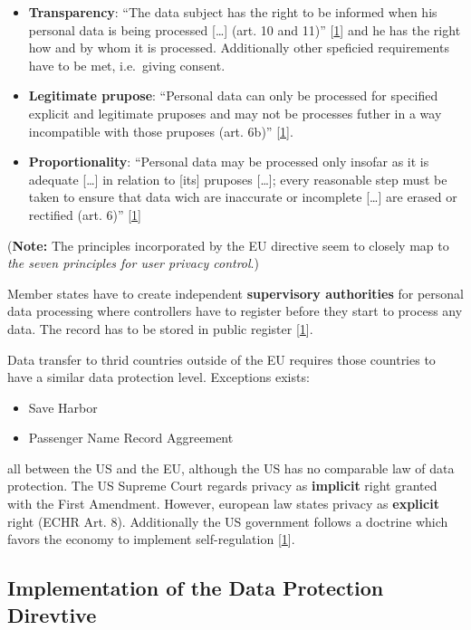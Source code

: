 \begin{itemize}
\item
\textbf{Transparency}: ``The data subject has the right to be informed when his personal data is being processed {[}\ldots{}{]} (art. 10 and 11)'' {[}\hyperref[references]{1}{]} and he has the right how and by whom it is processed.
Additionally other speficied requirements have to be met, i.e.~giving consent.
\item
\textbf{Legitimate prupose}: ``Personal data can only be processed for specified explicit and legitimate pruposes and may not be processes futher in a way incompatible with those pruposes (art. 6b)''
{[}\hyperref[references]{1}{]}.
\item
\textbf{Proportionality}: ``Personal data may be processed only insofar as it is adequate {[}\ldots{}{]} in relation to {[}its{]} pruposes {[}\ldots{}{]}; every reasonable step must be taken to ensure that data wich are inaccurate or incomplete {[}\ldots{}{]} are erased or rectified (art. 6)'' {[}\hyperref[references]{1}{]}
\end{itemize}

(\textbf{Note:} The principles incorporated by the EU directive seem to closely map to \emph{the seven principles for user privacy control}.)

Member states have to create independent \textbf{supervisory authorities} for personal data processing where controllers have to register before they start to process any data.
The record has to be stored in public register {[}\hyperref[references]{1}{]}.

Data transfer to thrid countries outside of the EU requires those countries to have a similar data protection level. Exceptions exists:

\begin{itemize}
\item
  Save Harbor
\item
  Passenger Name Record Aggreement
\end{itemize}

all between the US and the EU, although the US has no comparable law of data protection. 
The US Supreme Court regards privacy as \textbf{implicit} right granted with the First Amendment. However, european law states privacy as \textbf{explicit} right (ECHR Art. 8).
Additionally the US government follows a doctrine which favors the economy to implement self-regulation {[}\hyperref[references]{1}{]}.

\subsection{Implementation of the Data Protection Direvtive}

